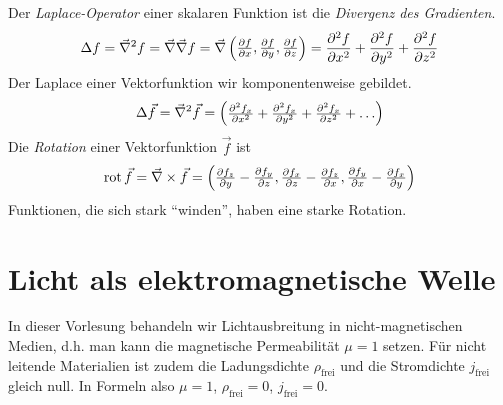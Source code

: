 Der \emph{Laplace-Operator}%
%
einer skalaren Funktion ist die \emph{Divergenz des Gradienten}.
\begin{gather*}
	\Delta f = \vecna^2 f= \vecna\vecna f = \vecna 
	\begin{pmatrix}
	\dif[f]{x},\dif[f]{y},\dif[f]{z}
	\end{pmatrix}
	= \diff[f]{x} + \diff[f]{y} + \diff[f]{z}
\end{gather*}
Der Laplace einer Vektorfunktion wir komponentenweise gebildet.
\begin{gather*}
	\Delta \vec{f} = \vecna^2 \vec{f}= 
	\begin{pmatrix}
		\diff[f_x]{x}+\diff[f_x]{y}+\diff[f_x]{z}+\dots
	\end{pmatrix}
\end{gather*}
Die \emph{Rotation} einer Vektorfunktion $\vec{f}$ ist
\begin{gather*}
	\Rot \vec{f}= \vecna\times \vec{f}=
	\begin{pmatrix}
		\dif[f_z]{y}-\dif[f_y]{z},\dif[f_x]{z}-\dif[f_z]{x},\dif[f_y]{x}-\dif[f_x]{y}
	\end{pmatrix}
\end{gather*}
Funktionen, die sich stark \enquote{winden}, haben eine starke Rotation.

\section{Licht als elektromagnetische Welle}
In dieser Vorlesung behandeln wir Lichtausbreitung in
nicht-magnetischen Medien, d.h. man kann die 
magnetische Permeabilität $\mu =1$%
setzen. Für nicht leitende Materialien ist zudem die
Ladungsdichte $\rho_\text{frei}$%
und die Stromdichte $j_\text{frei}$%
gleich
null. In Formeln also $\mu=1$, $\rho_\text{frei}=0$, $j_\text{frei}=0$.

